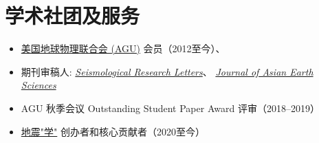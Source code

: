 \section{学术社团及服务}

\begin{itemize}
\item \href{https://sites.agu.org/}{美国地球物理联合会 (AGU)} 会员（2012至今）、
\item 期刊审稿人:
      \textit{\href{https://pubs.geoscienceworld.org/srl/}{Seismological Research Letters}}、
      \textit{\href{https://www.journals.elsevier.com/journal-of-asian-earth-sciences/}{Journal of Asian Earth Sciences}}
\item AGU 秋季会议 Outstanding Student Paper Award 评审（2018--2019）
\item \href{https://seismo-learn.org/}{地震"学"} 创办者和核心贡献者（2020至今）
\end{itemize}
